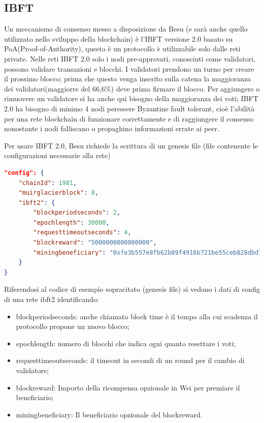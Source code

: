 \documentclass[12pt,titlepage]{report}
\begin{document}
\subsection{IBFT}
Un meccanismo di consenso messo a disposizione da Besu (e sarà anche quello utilizzato nello sviluppo della blockchain) è l'IBFT versione 2.0 basato su PoA(Proof-of-Authority), questo è un protocollo è utilizzabile solo dalle reti private. Nelle reti IBFT 2.0 solo i nodi pre-approvati, conosciuti come validatori, possono validare transazioni e blocchi. I validatori prendono un turno per creare il prossimo blocco; prima che questo venga inserito sulla catena la maggioranza dei validatori(maggiorre del 66,6\%) deve prima firmare il blocco. Per aggiungere o rimuovere un validatore si ha anche qui bisogno della maggioranza dei voti; IBFT 2.0 ha bisogno di minimo 4 nodi peressere Byzantine fault tolerant, cioè l'abilità per una rete blockchain di funzionare correttamente e di raggiungere il consenso nonostante i nodi falliscano o propaghino informazioni errate ai peer.

Per usare IBFT 2.0, Besu richiede la scrittura di un genesis file (file contenente le configurazioni necessarie alla rete)
\begin{lstlisting}[language=json,firstnumber=1]
"config": {
	"chainId": 1981,
	"muirglacierblock": 0,
	"ibft2": {
		"blockperiodseconds": 2,
        "epochlength": 30000,
        "requesttimeoutseconds": 4,
        "blockreward": "5000000000000000",
        "miningbeneficiary": "0xfe3b557e8fb62b89f4916b721be55ceb828dbd73"
    }
}
\end{lstlisting}
Riferendosi al codice di esempio sopracitato (genesis file) si vedono i dati di config di una rete ibft2 identificando:
\begin{itemize}
\item blockperiodseconds: anche chiamato block time è il tempo alla cui scadenza il protocollo propone un nuovo blocco;
\item epochlength: numero di blocchi che indica ogni quanto resettare i voti;
\item requesttimeoutseconds: il timeout in secondi di un round per il cambio di validatore;
\item blockreward: Importo della ricompensa opzionale in Wei per premiare il beneficiario;
\item miningbeneficiary: Il beneficiario opzionale del blockreward.
\end{itemize}
\end{document}
